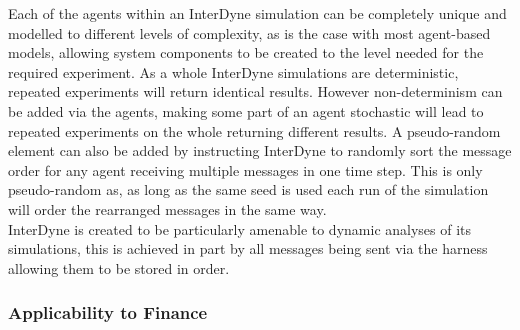 \documentclass{article}
\begin{document}
Each of the agents within an InterDyne simulation can be completely unique and modelled to different levels of complexity, as is the case with most agent-based models, allowing system components to be created to the level needed for the required experiment. As a whole InterDyne simulations are deterministic, repeated experiments will return identical results. However non-determinism can be added via the agents, making some part of an agent stochastic will lead to repeated experiments on the whole returning different results. A pseudo-random element can also be added by instructing InterDyne to randomly sort the message order for any agent receiving multiple messages in one time step. This is only pseudo-random as, as long as the same seed is used each run of the simulation will order the rearranged messages in the same way.\\
InterDyne is created to be particularly amenable to dynamic analyses of its simulations, this is achieved in part by all messages being sent via the harness allowing them to be stored in order.     


\subsubsection{Applicability to Finance} \label{applicabilut_to_finance}
\end{document}

